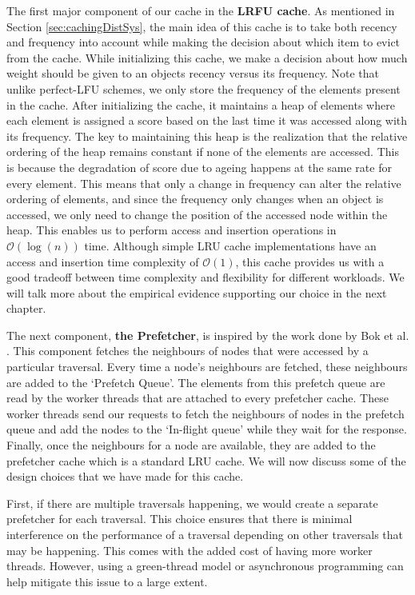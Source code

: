 \medskip
The first major component of our cache in the \textbf{LRFU
cache}\cite{lee2001lrfu}. As mentioned in Section \ref{sec:cachingDistSys}, the
main idea of this cache is to take both recency and frequency into account while
making the decision about which item to evict from the cache. While initializing
this cache, we make a decision about how much weight should be given to an
objects recency versus its frequency. Note that unlike perfect-LFU schemes, we
only store the frequency of the elements present in the cache. After
initializing the cache, it maintains a heap of elements where each element is
assigned a score based on the last time it was accessed along with its
frequency. The key to maintaining this heap is the realization that the relative
ordering of the heap remains constant if none of the elements are accessed. This
is because the degradation of score due to ageing happens at the same
rate for every element. This means that only a change in frequency can alter
the relative ordering of elements, and since the frequency only changes when an
object is accessed, we only need to change the position of the accessed node
within the heap. This enables us to perform access and insertion operations in
$\mathcal{O}(\log(n))$ time. Although simple LRU cache implementations have an
access and insertion time complexity of $\mathcal{O}(1)$,  this cache provides 
us with a good tradeoff between time complexity and flexibility for 
different workloads. We will talk more about the empirical evidence supporting
our choice in the next chapter.

\medskip
The next component, \textbf{the Prefetcher}, is inspired by the work done
by Bok et al. \cite{bok2020memory}. This component fetches the neighbours of
nodes that were accessed by a particular traversal. Every time a node's
neighbours are fetched, these neighbours are added to the `Prefetch Queue'. The
elements from this prefetch queue are read by the worker threads that are
attached to every prefetcher cache. These worker threads send our requests to
fetch the neighbours of nodes in the prefetch queue and add the nodes to the
`In-flight queue' while they wait for the response. Finally, once the neighbours
for a node are available, they are added to the prefetcher cache which is a
standard LRU cache. We will now discuss some of the design choices that we have
made for this cache.

\medskip
First, if there are multiple traversals happening, we would create a separate
prefetcher for each traversal. This choice ensures that there is minimal
interference on the performance of a traversal depending on other traversals
that may be happening. This comes with the added cost of having more worker
threads. However, using a green-thread model or asynchronous programming can help
mitigate this issue to a large extent. 


